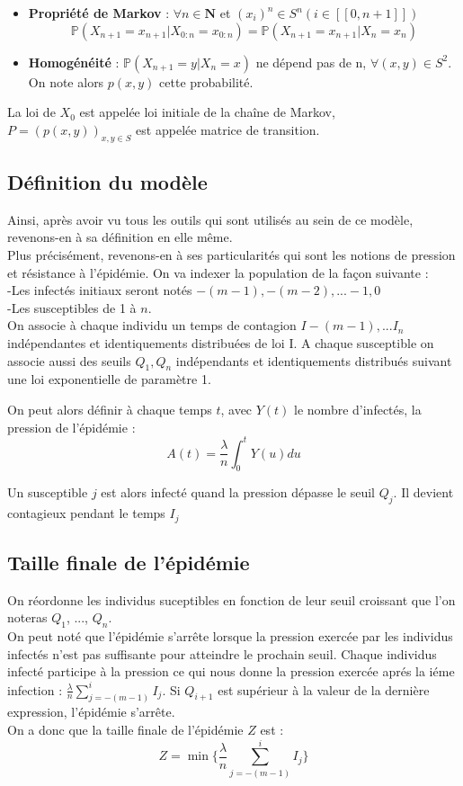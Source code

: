 \begin{itemize}
    \item \textbf{Propriété de Markov} : $\forall n \in \boldsymbol{N}$ et $(x_i)^n \in S^n (i \in [[0, n+1]])$ \\
$$ \mathbb{P}(X_{n+1} = x_{n+1} | X_{0:n} = x_{0:n}) = \mathbb{P}(X_{n+1} = x_{n+1} | X_n = x_n) $$
    \item \textbf{Homogénéité} : $\mathbb{P}(X_{n+1} = y | X_n = x)$ ne dépend pas de n, $\forall (x, y) \in S^2$. On note alors $p(x, y)$ cette probabilité.
\end{itemize}

La loi de $X_0$ est appelée loi initiale de la chaîne de Markov, $P = (p(x, y))_{x,y \in S}$ est appelée matrice de transition.



\subsection{Définition du modèle}

Ainsi, après avoir vu tous les outils qui sont utilisés au sein de ce modèle, revenons-en à sa définition en elle même. \\
Plus précisément, revenons-en à ses particularités qui sont les notions de pression et résistance à l'épidémie. On va indexer la population de la façon suivante :\\
-Les infectés initiaux seront notés $-(m-1), -(m-2), ...  -1, 0$\\
-Les susceptibles de 1 à $n$.\\
On associe à chaque individu un temps de contagion $I-(m-1), ...I_n$ indépendantes et identiquements distribuées de loi I. A chaque susceptible on associe aussi des seuils $Q_1, Q_n$ indépendants et identiquements distribués suivant une loi exponentielle de paramètre 1.

On peut alors définir à chaque temps $t$, avec $Y(t)$ le nombre d'infectés, la pression de l'épidémie :
$$ A(t) = \frac{\lambda}{n} \int^t_0 Y(u)du $$

Un susceptible $j$ est alors infecté quand la pression dépasse le seuil $Q_j$. Il devient contagieux pendant le temps $I_j$

\subsection{Taille finale de l'épidémie}

On réordonne les individus suceptibles en fonction de leur seuil croissant que l'on noteras $Q_1$, ..., $Q_n$. \\
On peut noté que l'épidémie s'arrête lorsque la pression exercée par les individus infectés n'est pas suffisante pour atteindre le prochain seuil. Chaque individus infecté participe à la pression ce qui nous donne la pression exercée aprés la iéme infection : $ \frac{\lambda}{n} \sum^i_{j = - (m-1)} I_j $. Si $Q_{i+1}$ est supérieur à la valeur de la dernière expression, l'épidémie s'arrête.\\
On a donc que la taille finale de l'épidémie $Z$ est :
$$ Z = \min \{\frac{\lambda}{n} \sum^i_{j = - (m-1)} I_j \} $$

